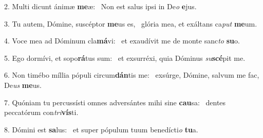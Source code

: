 2. Multi dicunt ánimæ \textbf{me}æ: \ast\  Non est salus ipsi in De\textit{o} \textbf{e}jus.\

3. Tu autem, Dómine, suscéptor \textbf{me}us es, \ast\  glória mea, et exáltans ca\textit{put} \textbf{me}um.\

4. Voce mea ad Dóminum cla\textbf{má}vi: \ast\  et exaudívit me de monte sanc\textit{to} \textbf{su}o.\

5. Ego dormívi, et sopo\textbf{rá}tus sum: \ast\  et exsurréxi, quia Dóminus \textit{su}\textbf{scé}pit me.\

6. Non timébo míllia pópuli circum\textbf{dán}tis me: \ast\  exsúrge, Dómine, salvum me fac, De\textit{us} \textbf{me}us.\

7. Quóniam tu percussísti omnes adversántes mihi sine \textbf{cau}sa: \ast\  dentes peccatórum con\textit{tri}\textbf{vís}ti.\

8. Dómini est \textbf{sa}lus: \ast\  et super pópulum tuum benedícti\textit{o} \textbf{tu}a.\


